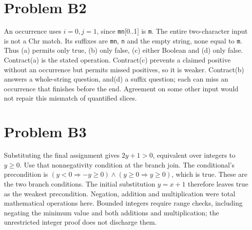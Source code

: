\documentclass[11pt]{article}
\begin{document}
\section*{Problem B2}\label{ans:B2}
\begin{answer}
An occurrence uses $i=0,j=1$, since \texttt{mn}[0..1] is
\texttt{m}. The entire two-character input is not a Chr match. Its suffixes
are \texttt{mn}, \texttt{n} and the empty string, none equal to \texttt{m}.
Thus (a) permits only true, (b) only false, (c) either Boolean and (d) only
false. Contract(a) is the stated operation. Contract(c) prevents a claimed
positive without an occurrence but permits missed positives, so it is weaker.
Contract(b) answers a whole-string question, and(d) a suffix question; each
can miss an occurrence that finishes before the end. Agreement on some other
input would not repair this mismatch of quantified slices.
\end{answer}
\section*{Problem B3}\label{ans:B3}
\begin{answer}
Substituting the final assignment gives $2y+1>0$, equivalent over integers
to $y\geq0$. Use that nonnegativity condition at the branch join. The conditional's precondition is
$(y<0\Rightarrow -y\geq0)\land(y\geq0\Rightarrow y\geq0)$, which is true.
These are the two branch conditions. The initial substitution $y=x+1$
therefore leaves true as the weakest precondition. Negation, addition and
multiplication were total mathematical operations here. Bounded integers
require range checks, including negating the minimum value and both additions
and multiplication; the unrestricted integer proof does not discharge them.
\end{answer}
\end{document}
